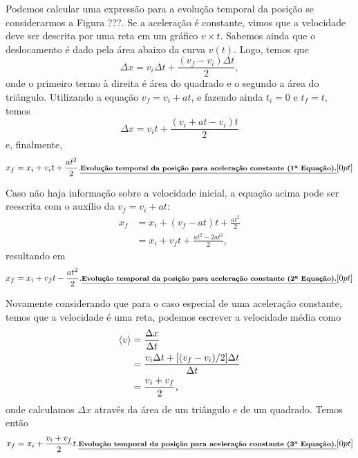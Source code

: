 Podemos calcular uma expressão para a evolução temporal da posição se considerarmos a Figura ???. Se a aceleração é constante, vimos que a velocidade deve ser descrita por uma reta em um gráfico $v\times t$. Sabemos ainda que o deslocamento é dado pela área abaixo da curva $v(t)$. Logo, temos que
\begin{equation}
  \Delta x = v_i\Delta t + \frac{(v_f - v_i)\Delta t}{2},
\end{equation}
%
onde o primeiro termo à direita é área do quadrado e o segundo a área do triângulo. Utilizando a equação $v_f = v_i + at$, e fazendo ainda $t_i = 0$ e $t_f = t$, temos
\begin{equation}
  \Delta x = v_i t + \frac{(v_i + at - v_i) t}{2}
\end{equation}
%
e, finalmente,
\begin{equation}\label{Eq:XX0V0TAT22}
  x_f = x_i + v_i t +\frac{at^2}{2}.\mathnote{Evolução temporal da posição para aceleração constante (1\textordfeminine~Equação).}
\end{equation}

Caso não haja informação sobre a velocidade inicial, a equação acima pode ser reescrita com o auxílio da $v_f = v_i + at$:
\begin{align}
  x_f &= x_i + (v_f - at) t + \frac{at^2}{2} \\
  &= x_i + v_f t + \frac{at^2 - 2at^2}{2},
\end{align}
%
resultando em
\begin{equation}
  x_f = x_i + v_f t - \frac{at^2}{2}.\mathnote{Evolução temporal da posição para aceleração constante (2\textordfeminine~Equação).}
\end{equation}

%
%
Novamente considerando que para o caso especial de uma aceleração constante, temos que a velocidade é uma reta, podemos escrever a velocidade média como
\begin{align}
  \left\langle{v}\right\rangle &= \frac{\Delta x}{\Delta t} \\
  &= \frac{v_i \Delta t + [(v_f - v_i)/2] \Delta t}{\Delta t} \\
  &= \frac{v_i + v_f}{2},
\end{align}
%
onde calculamos $\Delta x$ através da área de um triângulo e de um quadrado.
Temos então
\begin{equation}
  x_f = x_i + \frac{v_i + v_f}{2} t.\mathnote{Evolução temporal da posição para aceleração constante (3\textordfeminine~Equação).}
\end{equation}

